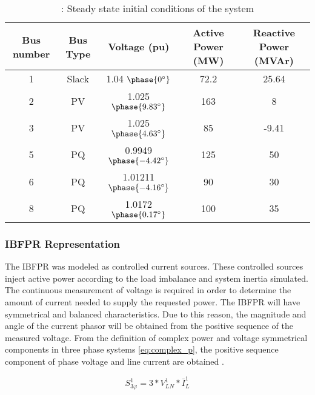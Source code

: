 \begin{table}[h]
	\caption{\label{tb:initial}: Steady state initial conditions of the system}
	\centering
	\begin{tabular}{ccccc}
		\toprule
		\textbf{Bus number}	& \textbf{Bus Type}	& \textbf{Voltage (pu)}& \textbf{Active Power (MW)}& \textbf{Reactive Power (MVAr)}\\
		\midrule
		1		& Slack			& 1.04 $\phase{0^{\circ}} $     &    72.2    & 25.64    \\
		2		& PV			& 1.025 $\phase{9.83^{\circ}} $      & 163      & 8     \\
		3		& PV			& 1.025 $\phase{4.63^{\circ}} $     & 85       &    -9.41 \\
		5		& PQ			& 0.9949 $\phase{-4.42^{\circ}} $       &125       &  50    \\
		6		& PQ			& 1.01211 $\phase{-4.16^{\circ}} $      &   90     &  30   \\
		8		& PQ			& 1.0172 $ \phase{0.17^{\circ}} $       &  100     &   35   \\

		\bottomrule
	\end{tabular}
\end{table}


\subsubsection{IBFPR Representation}


The IBFPR was modeled as controlled current sources. These controlled sources inject active power according to the load imbalance and system inertia simulated. The continuous measurement of voltage is required in order to determine the amount of current needed to supply the requested power. The IBFPR will have symmetrical and balanced characteristics. Due to this reason, the magnitude and angle of the current phasor will be obtained from the positive sequence of the measured voltage. From the definition of complex power and voltage symmetrical components in three phase systems \eqref{eq:complex_p}, the positive sequence component of phase voltage and line current are obtained \cite{john1994power}.

\begin{equation}
\label{eq:complex_p}
S_{3\varphi}^1=3*V_{LN}^1*\bar{I}_{L}^1
\end{equation}

